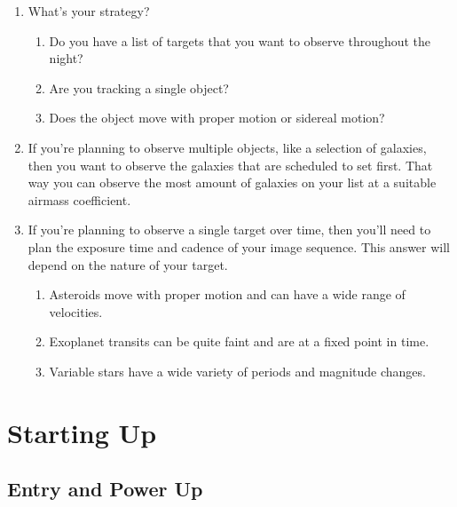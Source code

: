 \documentclass{article}
\begin{document}
			\begin{enumerate}
			
				\item What's your strategy?
				
				\begin{enumerate}
					
					\item Do you have a list of targets that you want to observe throughout the night?
					
					\item Are you tracking a single object?
					
					\item Does the object move with proper motion or sidereal motion?
					
				\end{enumerate}
				
				\item If you're planning to observe multiple objects, like a selection of galaxies, then you want to observe the galaxies that are scheduled to set first. That way you can observe the most amount of galaxies on your list at a suitable airmass coefficient.
				
				\item If you're planning to observe a single target over time, then you'll need to plan the exposure time and cadence of your image sequence. This answer will depend on the nature of your target.
				
				\begin{enumerate}
					
					\item Asteroids move with proper motion and can have a wide range of velocities.
					
					\item Exoplanet transits can be quite faint and are at a fixed point in time.
					
					\item Variable stars have a wide variety of periods and magnitude changes.
					
				\end{enumerate}
			
			\end{enumerate}
		
	\newpage
	\section{Starting Up}
	
		\subsection{Entry and Power Up}
		
\end{document}
